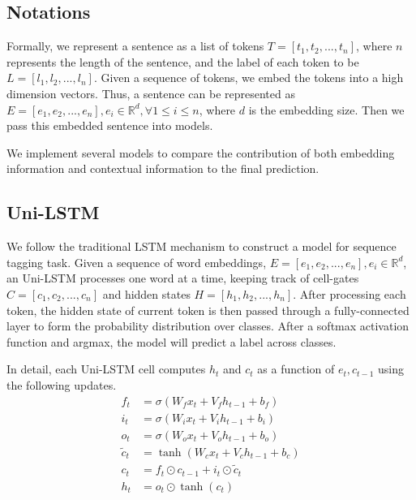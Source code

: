 \documentclass{article}
\newcommand{\red}[1]{\textcolor{red}{#1}}
\begin{document}
\subsection{Notations}
Formally, we represent a sentence as a list of tokens $T = [t_1, t_2, ... , t_n]$, where $n$ represents the length of the sentence, and the label of each token to be $L = [l_1, l_2, ... , l_n]$. Given a sequence of tokens, we embed the tokens into a high dimension vectors. Thus, a sentence can be represented as $E = [e_1, e_2, ... , e_n], e_i \in \mathbb{R}^d, \forall 1 \leq i \leq n$, where $d$ is the embedding size. Then we pass this embedded sentence into models.


We implement several models to compare the contribution of both embedding information and contextual information to the final prediction. 


\subsection{Uni-LSTM}

We follow the traditional LSTM mechanism to construct a model for sequence tagging task. Given a sequence of word embeddings, $E = [e_1, e_2, ... , e_n], e_i \in \mathbb{R}^d$, an Uni-LSTM processes one word at a time, keeping track of cell-gates $C = [c_1, c_2, ... , c_n]$ and hidden states $H = [h_1, h_2, ... , h_n]$. After processing each token, the hidden state of current token is then passed through a fully-connected layer to form the probability distribution over classes. After a softmax activation function and argmax, the model will predict a label across classes.

In detail, each Uni-LSTM cell computes $h_t$ and $c_t$ as a function of $e_t, c_{t-1}$ using the following updates. 
\begin{align} 
f_t & = \sigma(W_f x_t + V_f h_{t - 1} + b_f) \label{eq:1f}\\
i_t & = \sigma(W_i x_t + V_i h_{t - 1} + b_i) \label{eq:1i}\\
o_t & = \sigma(W_o x_t + V_o h_{t - 1} + b_o) \label{eq:1o}\\
\tilde{c}_t & = \tanh(W_c x_t + V_c h_{t - 1} + b_c) \\
c_t & = f_t \odot c_{t - 1} + i_t \odot \tilde{c}_t \label{eq:1c}\\
h_t & = o_t \odot \tanh(c_t)\label{eq:1h}
\end{align}
\end{document}
